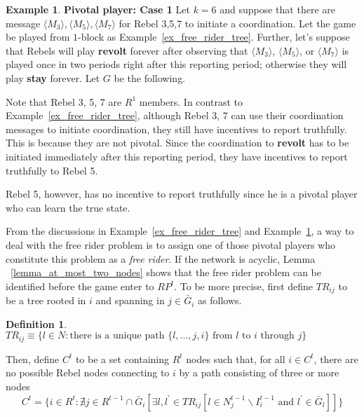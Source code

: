 \documentclass[12pt,letter]{article}
\newtheorem{definition}{Definition}[section]
\theoremstyle{definition}
\newtheorem{example}{Example}[section]
\theoremstyle{remark}
\theoremstyle{claim}
\begin{document}
\begin{example} \label{ex_pivotal_1}\textbf{Pivotal player: Case 1}
Let $k=6$ and suppose that there are message $\langle M_3 \rangle,\langle M_5 \rangle, \langle M_7 \rangle$ for Rebel 3,5,7 to initiate a coordination. Let the game be played from $1$-block as Example~\ref{ex_free_rider_tree}. Further, let's suppose that Rebels will play \textbf{revolt} forever after observing that $\langle M_3 \rangle$, $\langle M_5 \rangle$, or $\langle M_7 \rangle$ is played once in two periods right after this reporting period; otherwise they will play \textbf{stay} forever. Let $G$ be the following.
\begin{center}
\end{center}

Note that Rebel 3, 5, 7 are $R^1$ members. In contrast to Example~\ref{ex_free_rider_tree}, although Rebel 3, 7 can use their coordination messages to initiate coordination, they still have incentives to report truthfully. This is because they are not pivotal. Since the coordination to \textbf{revolt} has to be initiated immediately after this reporting period, they have incentives to report truthfully to Rebel 5.

Rebel 5, however, has no incentive to report truthfully since he is a pivotal player who can learn the true state.
\end{example}
   
From the discussions in Example~\ref{ex_free_rider_tree} and Example~\ref{ex_pivotal_1}, a way to deal with the free rider problem is to assign one of those pivotal players who constitute this problem as a \textit{free rider}. If the network is acyclic, Lemma ~\ref{lemma_at_most_two_nodes} shows that the free rider problem can be identified before the game enter to $RP^t$. To be more precise, first define $TR_{ij}$ to be a tree rooted in $i$ and spanning in $j\in \bar{G}_i$ as follows.
\begin{definition}
$TR_{ij}\equiv \{l\in N:\text{there is a unique path $\{l,...,j,i\}$ from $l$ to $i$ through $j$}\}$
\end{definition}
Then, define $C^t$ to be a set containing $R^t$ nodes such that, for all $i\in C^t$, there are no possible Rebel nodes connecting to $i$ by a path consisting of three or more nodes
\[C^t=\{i\in R^t:\nexists j\in R^{t-1}\cap \bar{G}_i[\exists l,l^{'}\in TR_{ij}[l\in N^{t-1}_j\backslash I^{t-1}_i \text{ and } l^{'}\in \bar{G}_l]]\}\]
\end{document}
